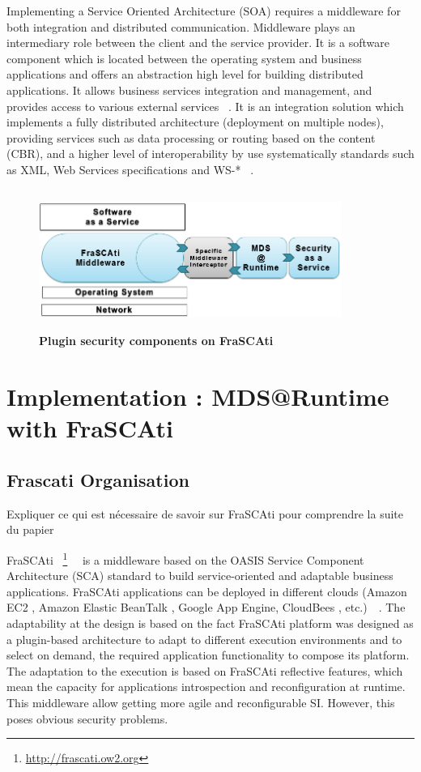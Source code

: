 \documentclass[runningheads,a4paper]{llncs}
\begin{document}
Implementing a Service Oriented Architecture (SOA) requires a middleware for both integration and distributed communication. Middleware plays an intermediary role between the client and the service provider. It is a software component which is located between the operating system and business applications and offers an abstraction high level for building distributed applications. It allows business services integration and management, and provides access to various external services ~\cite{SHLP05}. It is an integration solution which implements a fully distributed architecture (deployment on multiple nodes), providing services such as data processing or routing based on the content (CBR), and a higher level of interoperability by use systematically standards such as XML, Web Services specifications and WS-* ~\cite{Lou08}. 
\begin{figure}[ht]  
\centering
\includegraphics[height=130pt, width=280pt]{architecture.PNG}
\caption{\textbf{Plugin security components on FraSCAti}}
\label{fig:SecaaS}
\end{figure}


\section{Implementation : MDS@Runtime with FraSCAti}
\subsection{Frascati Organisation}
Expliquer ce qui est n\'ecessaire de savoir sur FraSCAti pour comprendre la suite du papier

FraSCAti ~\footnote{\url{http://frascati.ow2.org}}~\cite{SMF09}~\cite{SMR12} is a middleware based on the OASIS Service Component Architecture (SCA) standard to build service-oriented and adaptable business applications. FraSCAti applications can be deployed in different clouds (Amazon EC2 , Amazon Elastic BeanTalk , Google App Engine, CloudBees , etc.)~\cite{MRS11}~\cite{PHM12}. The adaptability at the design is based on the fact FraSCAti platform was designed as a plugin-based architecture to adapt to different execution environments and to select on demand, the required application functionality to compose its platform. The adaptation to the execution is based on FraSCAti reflective features, which mean the capacity for applications introspection and reconfiguration at runtime. This middleware allow getting more agile and reconfigurable SI. However, this poses obvious security problems.
\end{document}
